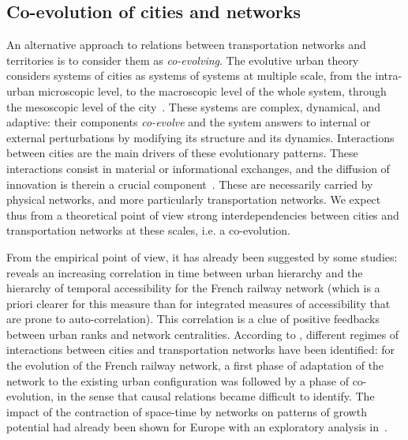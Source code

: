\documentclass[11pt]{article}
\begin{document}
\subsection{Co-evolution of cities and networks}


An alternative approach to relations between transportation networks and territories is to consider them as \emph{co-evolving}. The evolutive urban theory considers systems of cities as systems of systems at multiple scale, from the intra-urban microscopic level, to the macroscopic level of the whole system, through the mesoscopic level of the city~\citep{pumain2008socio}. These systems are complex, dynamical, and adaptive: their components \emph{co-evolve} and the system answers to internal or external perturbations by modifying its structure and its dynamics. Interactions between cities are the main drivers of these evolutionary patterns. These interactions consist in material or informational exchanges, and the diffusion of innovation is therein a crucial component~\citep{pumain2010theorie}. These are necessarily carried by physical networks, and more particularly transportation networks. We expect thus from a theoretical point of view strong interdependencies between cities and transportation networks at these scales, i.e. a co-evolution.

From the empirical point of view, it has already been suggested by some studies: \cite{bretagnolle2003vitesse} reveals an increasing correlation in time between urban hierarchy and the hierarchy of temporal accessibility for the French railway network (which is a priori clearer for this measure than for integrated measures of accessibility that are prone to auto-correlation). This correlation is a clue of positive feedbacks between urban ranks and network centralities. According to \cite{bretagnolle:tel-00459720}, different regimes of interactions between cities and transportation networks have been identified: for the evolution of the French railway network, a first phase of adaptation of the network to the existing urban configuration was followed by a phase of co-evolution, in the sense that causal relations became difficult to identify. The impact of the contraction of space-time by networks on patterns of growth potential had already been shown for Europe with an exploratory analysis in~\citep{bretagnolle1998space}.
\end{document}
